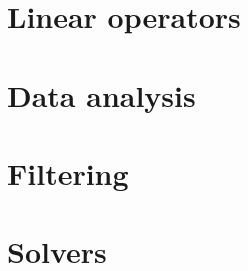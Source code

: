 \documentclass[10pt]{book}
\begin{document}
\chapter{Linear operators}\label{sec:lop}
   


\chapter{Data analysis}\label{sec:analysis}


\chapter{Filtering}\label{sec:filter}



\chapter{Solvers}\label{sec:solvers}
   
   

    
\end{document}
